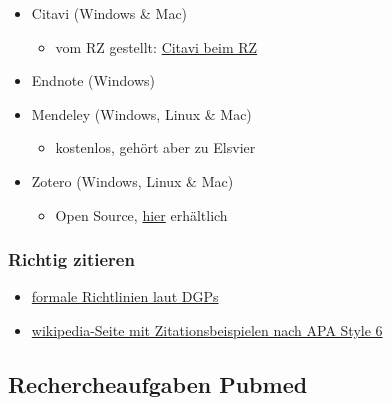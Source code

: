 \documentclass[
]{book}
\providecommand{\tightlist}{%
  \setlength{\itemsep}{0pt}\setlength{\parskip}{0pt}}
\begin{document}
\begin{itemize}
\item
  Citavi (Windows \& Mac)

  \begin{itemize}
  \tightlist
  \item
    vom RZ gestellt: \href{https://www.rz.uni-kiel.de/de/angebote/software/citavi}{Citavi beim RZ}
  \end{itemize}
\item
  Endnote (Windows)
\item
  Mendeley (Windows, Linux \& Mac)

  \begin{itemize}
  \tightlist
  \item
    kostenlos, gehört aber zu Elsvier
  \end{itemize}
\item
  Zotero (Windows, Linux \& Mac)

  \begin{itemize}
  \tightlist
  \item
    Open Source, \href{https://www.zotero.org/}{hier} erhältlich
  \end{itemize}
\end{itemize}

\hypertarget{richtig-zitieren}{%
\subsubsection{Richtig zitieren}\label{richtig-zitieren}}

\begin{itemize}
\item
  \href{https://elibrary.hogrefe.de/book/99.110005/9783840927638}{formale Richtlinien laut DGPs}
\item
  \href{https://en.wikipedia.org/wiki/APA_style}{wikipedia-Seite mit Zitationsbeispielen nach APA Style 6}
\end{itemize}

\hypertarget{rechercheaufgaben-pubmed}{%
\subsection{Rechercheaufgaben Pubmed}\label{rechercheaufgaben-pubmed}}
\end{document}
